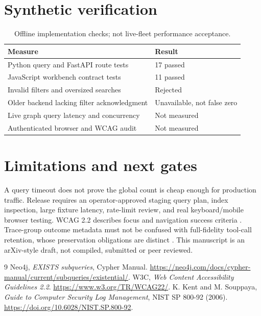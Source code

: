 \documentclass[11pt]{article}
\begin{document}
\section{Synthetic verification}
\begin{table}[h]\centering
\caption{Offline implementation checks; not live-fleet performance acceptance.}
\begin{tabular}{ll}\toprule
Measure & Result\\\midrule
Python query and FastAPI route tests & 17 passed\\
JavaScript workbench contract tests & 11 passed\\
Invalid filters and oversized searches & Rejected\\
Older backend lacking filter acknowledgment & Unavailable, not false zero\\
Live graph query latency and concurrency & Not measured\\
Authenticated browser and WCAG audit & Not measured\\
\bottomrule\end{tabular}\end{table}
\section{Limitations and next gates}
A query timeout does not prove the global count is cheap enough for production traffic. Release requires an operator-approved staging query plan, index inspection, large fixture latency, rate-limit review, and real keyboard/mobile browser testing. WCAG 2.2 describes focus and navigation success criteria \cite{wcag22}. Trace-group outcome metadata must not be confused with full-fidelity tool-call retention, whose preservation obligations are distinct \cite{nist92}. This manuscript is an arXiv-style draft, not compiled, submitted or peer reviewed.
\begin{thebibliography}{9}
 Neo4j, \emph{EXISTS subqueries}, Cypher Manual. \url{https://neo4j.com/docs/cypher-manual/current/subqueries/existential/}.
 W3C, \emph{Web Content Accessibility Guidelines 2.2}. \url{https://www.w3.org/TR/WCAG22/}.
 K. Kent and M. Souppaya, \emph{Guide to Computer Security Log Management}, NIST SP 800-92 (2006). \url{https://doi.org/10.6028/NIST.SP.800-92}.
\end{thebibliography}
\end{document}

